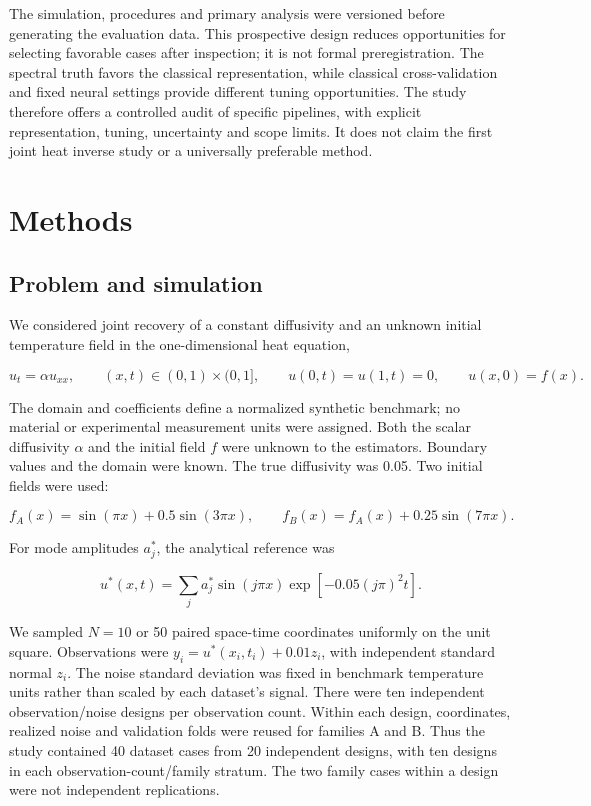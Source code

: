 \documentclass[10pt,a4paper]{article}
\begin{document}
The simulation, procedures and primary analysis were versioned before generating
the evaluation data. This prospective design reduces opportunities for selecting
favorable cases after inspection; it is not formal preregistration. The spectral
truth favors the classical representation, while classical cross-validation and
fixed neural settings provide different tuning opportunities. The study therefore
offers a controlled audit of specific pipelines, with explicit representation,
tuning, uncertainty and scope limits. It does not claim the first joint heat
inverse study or a universally preferable method.

\section{Methods}

\subsection{Problem and simulation}

We considered joint recovery of a constant diffusivity and an unknown initial
temperature field in the one-dimensional heat equation,

\begin{equation}
u_t=\alpha u_{xx},\qquad (x,t)\in(0,1)\times(0,1],
\qquad u(0,t)=u(1,t)=0,\qquad u(x,0)=f(x).
\end{equation}

The domain and coefficients define a normalized synthetic benchmark; no material
or experimental measurement units were assigned. Both the scalar diffusivity
\(\alpha\) and the initial field \(f\) were unknown to the estimators. Boundary
values and the domain were known. The true diffusivity was 0.05. Two initial
fields were used:

\begin{equation}
f_A(x)=\sin(\pi x)+0.5\sin(3\pi x),\qquad
f_B(x)=f_A(x)+0.25\sin(7\pi x).
\end{equation}

For mode amplitudes \(a_j^*\), the analytical reference was

\begin{equation}
u^*(x,t)=\sum_j a_j^*\sin(j\pi x)
                 \exp[-0.05(j\pi)^2t].
\end{equation}

We sampled \(N=10\) or 50 paired space-time coordinates uniformly on the unit
square. Observations were \(y_i=u^*(x_i,t_i)+0.01z_i\), with independent standard
normal \(z_i\). The noise standard deviation was fixed in benchmark temperature
units rather than scaled by each dataset's signal. There were ten independent
observation/noise designs per observation count. Within each design, coordinates,
realized noise and validation folds were reused for families A and B. Thus the
study contained 40 dataset cases from 20 independent designs, with ten designs
in each observation-count/family stratum. The two family cases within a design
were not independent replications.
\end{document}
